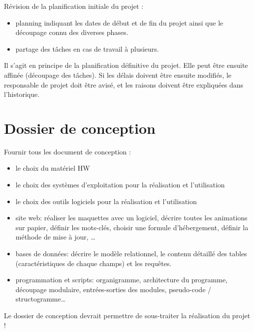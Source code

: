 Révision de la planification initiale du projet :
\begin{itemize}
  \item planning indiquant les dates de début et de fin du projet ainsi que le découpage connu des diverses phases. 
  \item partage des tâches en cas de travail à plusieurs.
\end{itemize}
Il s’agit en principe de la planification définitive du projet. Elle peut être ensuite affinée (découpage des tâches). Si les délais doivent être ensuite modifiés, le responsable de projet doit être avisé, et les raisons doivent être expliquées dans l’historique.

\section{Dossier de conception}

Fournir tous les document de conception :
\begin{itemize}
  \item le choix du matériel HW
    \item le choix des systèmes d'exploitation pour la réalisation et l'utilisation
    \item le choix des outils logiciels pour la réalisation et l'utilisation
    \item site web: réaliser les maquettes avec un logiciel, décrire toutes les animations sur papier, définir les mots-clés, choisir une formule d'hébergement, définir la méthode de mise à jour, …
    \item bases de données: décrire le modèle relationnel, le contenu détaillé des tables (caractéristiques de chaque champs) et les requêtes.
    \item programmation et scripts: organigramme, architecture du programme, découpage modulaire, entrées-sorties des modules, pseudo-code / structogramme…
\end{itemize}

Le dossier de conception devrait permettre de sous-traiter la réalisation du projet !
